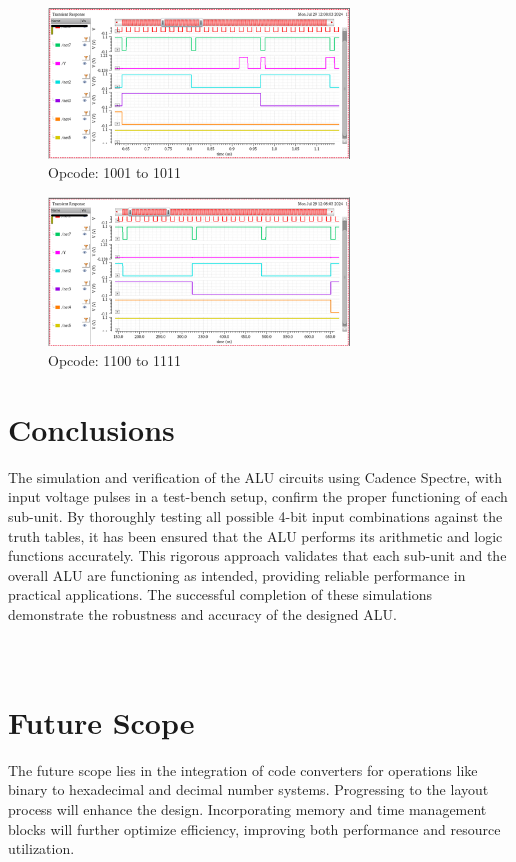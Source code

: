 \documentclass[conference]{IEEEtran}
\begin{document}
\begin{figure}[H]
\centerline{\includegraphics[width=8cm,keepaspectratio,]{"Opcode_1001_1011.png"}}
\caption{Opcode: 1001 to 1011}
\label{fig13}
\end{figure}
\begin{figure}[H]
\centerline{\includegraphics[width=8cm,keepaspectratio,]{"Opcode_1100_1111.png"}}
\caption{Opcode: 1100 to 1111}
\label{fig14}
\end{figure}

\section{Conclusions}\label{F}
The simulation and verification of the ALU circuits using Cadence Spectre, with input voltage pulses in a test-bench setup, confirm the proper functioning of each sub-unit. By thoroughly testing all possible 4-bit input combinations against the truth tables, it has been ensured that the ALU performs its arithmetic and logic functions accurately. This rigorous approach validates that each sub-unit and the overall ALU are functioning as intended, providing reliable performance in practical applications. The successful completion of these simulations demonstrate the robustness and accuracy of the designed ALU. 
\\ \\ \\

\section{Future Scope}\label{G}
The future scope lies in the integration of code converters for operations like binary to hexadecimal and decimal number systems. Progressing to the layout process will enhance the design. Incorporating memory and time management blocks will further optimize efficiency, improving both performance and resource utilization.
\\ 
\end{document}
